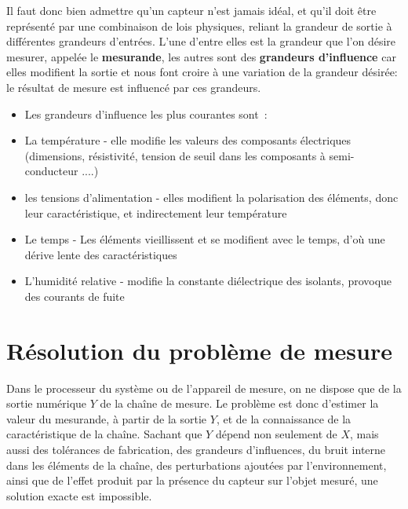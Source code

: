 Il faut donc bien admettre qu'un capteur n'est jamais idéal, et qu'il doit être représenté par une combinaison de lois physiques, reliant la grandeur de sortie à différentes grandeurs d'entrées. L'une d'entre elles est la grandeur que l'on désire mesurer, appelée le \textbf{mesurande}, les autres sont des \textbf{grandeurs d'influence} car elles modifient la sortie et nous font croire à une variation de la grandeur désirée: le résultat de mesure est influencé par ces grandeurs.
\begin{center}
\end{center}

\begin{itemize}\itemsep1pt
\renewcommand{\labelitemi}{$\bullet$}
\item Les grandeurs d'influence les plus courantes sont~:
\item La température - elle modifie les valeurs des composants électriques (dimensions, résistivité, tension de seuil dans les composants à semi-conducteur ....)
\item les tensions d'alimentation - elles modifient la polarisation des éléments, donc leur caractéristique, et indirectement leur température
\item Le temps - Les éléments vieillissent et se modifient avec le temps, d'où une dérive lente des caractéristiques
\item L'humidité relative - modifie la constante diélectrique des isolants, provoque des courants de fuite
\end{itemize}

\section{Résolution du problème de mesure}

Dans le processeur du système ou de l'appareil de mesure, on ne dispose que de la sortie numérique $Y$ de la chaîne de mesure. Le problème est donc d'estimer la valeur du mesurande, à partir de la sortie $Y$, et de la connaissance de la caractéristique de la chaîne. Sachant que $Y$ dépend non seulement de $X$, mais aussi des tolérances de fabrication, des grandeurs d'influences, du bruit interne dans les éléments de la chaîne, des perturbations ajoutées par l'environnement, ainsi que de l'effet produit par la présence du capteur sur l'objet mesuré, une solution exacte est impossible.

